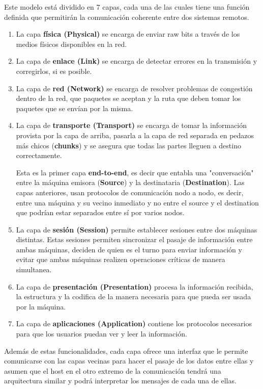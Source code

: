 \documentclass[10pt,a4paper]{article}
\begin{document}
Este modelo está dividido en 7 capas, cada una de las cuales tiene una función definida que permitirán la comunicación coherente entre dos sistemas remotos.  

\begin{enumerate}
  \item La capa \textbf{física (Physical)} se encarga de enviar raw bits a través de los medios físicos disponibles en la red. 
  \item La capa de \textbf{enlace (Link)} se encarga de detectar errores en la transmisión y corregirlos, si es posible.
  \item La capa de \textbf{red (Network)} se encarga de resolver problemas de congestión dentro de la red, que paquetes se aceptan y la ruta que deben tomar los paquetes que se envían por la misma.
  \item La capa de \textbf{transporte (Transport)} se encarga de tomar la información provista por la capa de arriba, pasarla a la capa de red separada en pedazos más chicos (\textbf{chunks}) y se asegura que todas las partes lleguen a destino correctamente. 
  
  Esta es la primer capa \textbf{end-to-end}, es decir que entabla una "conversación" entre la máquina emisora (\textbf{Source}) y la destinataria (\textbf{Destination}). Las capas anteriores, usan protocolos de comunicación nodo a nodo, es decir, entre una máquina y su vecino inmediato y no entre el source y el destination que podrían estar separados entre sí por varios nodos.
  
  \item La capa de \textbf{sesión  (Session)} permite establecer sesiones entre dos máquinas distintas. Estas sesiones permiten sincronizar el pasaje de información entre ambas máquinas, deciden de quien es el turno para enviar información y evitar que ambas máquinas realizen operaciones críticas de manera simultanea.
  \item La capa de \textbf{presentación (Presentation)} procesa la información recibida, la estructura y la codifica de la manera necesaria para que pueda ser usada por la máquina.
  \item La capa de \textbf{aplicaciones (Application)} contiene los protocolos necesarios para que los usuarios puedan ver y leer la información.
\end{enumerate}

Además de estas funcionalidades, cada capa ofrece una interfaz que le permite comunicarse con las capas vecinas para hacer el pasaje de los datos entre ellas y asumen que el host en el otro extremo de la comunicación tendrá una arquitectura similar y podrá interpretar los mensajes de cada una de ellas.
\end{document}
